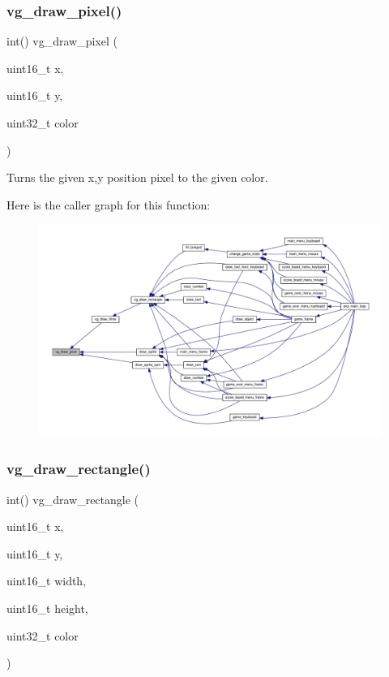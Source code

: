\subsubsection{\texorpdfstring{vg\+\_\+draw\+\_\+pixel()}{vg\_draw\_pixel()}}
{\footnotesize\ttfamily int() vg\+\_\+draw\+\_\+pixel (\begin{DoxyParamCaption}\item[{uint16\+\_\+t}]{x,  }\item[{uint16\+\_\+t}]{y,  }\item[{uint32\+\_\+t}]{color }\end{DoxyParamCaption})}



Turns the given x,y position pixel to the given color. 

Here is the caller graph for this function\+:
\nopagebreak
\begin{figure}[H]
\begin{center}
\leavevmode
\includegraphics[width=350pt]{group__graphics_ga08c498ffeb0a3962e3b7711b57397741_icgraph}
\end{center}
\end{figure}
\mbox{\label{group__graphics_ga99d2da2559e11200c6b40c469e9977ec}} 
\subsubsection{\texorpdfstring{vg\+\_\+draw\+\_\+rectangle()}{vg\_draw\_rectangle()}}
{\footnotesize\ttfamily int() vg\+\_\+draw\+\_\+rectangle (\begin{DoxyParamCaption}\item[{uint16\+\_\+t}]{x,  }\item[{uint16\+\_\+t}]{y,  }\item[{uint16\+\_\+t}]{width,  }\item[{uint16\+\_\+t}]{height,  }\item[{uint32\+\_\+t}]{color }\end{DoxyParamCaption})}



